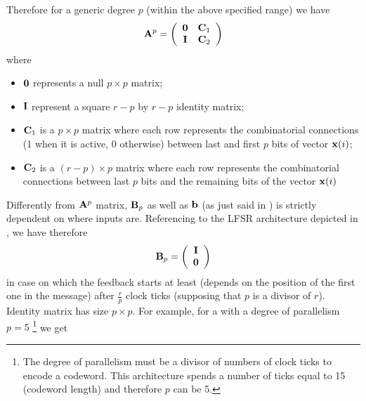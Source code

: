 Therefore for a generic degree $p$ (within the above specified range) we have
\begin{equation} \label{eq:Apreg}
\mathbf{A}^p =
\left(
\begin{array}{cc}
\mathbf{0} & \mathbf{C}_1 \\
\mathbf{I} & \mathbf{C}_2
\end{array}
\right)
\end{equation}
where
\begin{itemize}
\item \(\mathbf{0}\) represents a null \(p \times p\) matrix;
\item $\mathbf{I}$ represent a square $r-p$ by $r-p$ identity matrix;
\item $\mathbf{C}_1$ is a $p \times p$ matrix where each row represents the combinatorial connections (1 when it is active, 0 otherwise) between last and first $p$ bits of vector $\mathbf{x}(i)$;
\item $\mathbf{C}_2$ is a $(r-p) \times p$ matrix where each row represents the combinatorial connections between last $p$ bits and the remaining bits of the vector \(\mathbf{x}(i)\)
\end{itemize}

Differently from $\mathbf{A}^p$ matrix, $\mathbf{B}_p$ as well as $\mathbf{b}$ (as just said in ) is strictly dependent on where inputs are. Referencing to the LFSR architecture depicted in , we have therefore
\begin{equation} \label{eq:Btrivial}
\mathbf{B}_p =
\left(
\begin{array}{c}
\mathbf{I} \\
\mathbf{0}
\end{array}
\right)
\end{equation}
in case on which the feedback starts at least (depends on the position of the first one in the message) after $\frac{r}{p}$ clock ticks (supposing that \(p\) is a divisor of \(r\)). Identity matrix has size $p\times p$. For example, for a  with a degree of parallelism $p=5$
\footnote{The degree of parallelism must be a divisor of numbers of clock ticks to encode a codeword. This architecture spends a number of ticks equal to 15 (codeword length) and therefore \(p\) can be 5.}
we get

